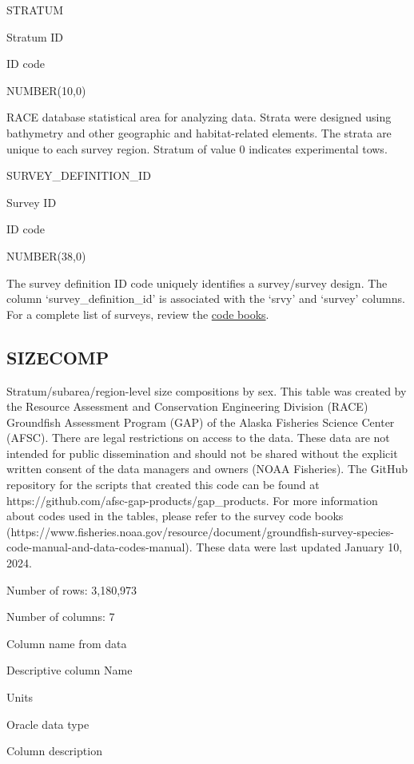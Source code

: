 \documentclass[
  letterpaper,
  oneside,
  open=any]{scrbook}
\begin{document}
STRATUM

Stratum ID

ID code

NUMBER(10,0)

RACE database statistical area for analyzing data. Strata were designed
using bathymetry and other geographic and habitat-related elements. The
strata are unique to each survey region. Stratum of value 0 indicates
experimental tows.

SURVEY\_DEFINITION\_ID

Survey ID

ID code

NUMBER(38,0)

The survey definition ID code uniquely identifies a survey/survey
design. The column `survey\_definition\_id' is associated with the
`srvy' and `survey' columns. For a complete list of surveys, review the
\href{https://www.fisheries.noaa.gov/resource/document/groundfish-survey-species-code-manual-and-data-codes-manual}{code
books}.

\hypertarget{sizecomp}{%
\subsection{SIZECOMP}\label{sizecomp}}

Stratum/subarea/region-level size compositions by sex. This table was
created by the Resource Assessment and Conservation Engineering Division
(RACE) Groundfish Assessment Program (GAP) of the Alaska Fisheries
Science Center (AFSC). There are legal restrictions on access to the
data. These data are not intended for public dissemination and should
not be shared without the explicit written consent of the data managers
and owners (NOAA Fisheries). The GitHub repository for the scripts that
created this code can be found at
https://github.com/afsc-gap-products/gap\_products. For more information
about codes used in the tables, please refer to the survey code books
(https://www.fisheries.noaa.gov/resource/document/groundfish-survey-species-code-manual-and-data-codes-manual).
These data were last updated January 10, 2024.

Number of rows: 3,180,973

Number of columns: 7

Column name from data

Descriptive column Name

Units

Oracle data type

Column description
\end{document}
